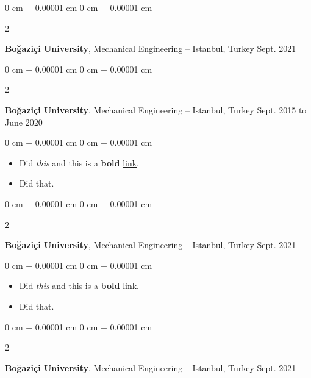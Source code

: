 \documentclass[10pt, letterpaper]{article}
\newenvironment{highlights}{
    \begin{itemize}[
        topsep=0.10 cm,
        parsep=0.10 cm,
        partopsep=0pt,
        itemsep=0pt,
        leftmargin=0 cm + 10pt
    ]
}{
    \end{itemize}
} %
\newenvironment{onecolentry}{
    \begin{adjustwidth}{
        0 cm + 0.00001 cm
    }{
        0 cm + 0.00001 cm
    }
}{
    \end{adjustwidth}
} %
\newenvironment{twocolentry}[2][]{
    \onecolentry
    \def\secondColumn{#2}
    \setcolumnwidth{\fill, 4.5 cm}
    \begin{paracol}{2}
}{
    \switchcolumn \raggedleft \secondColumn
    \end{paracol}
    \endonecolentry
} %
\begin{document}
        \vspace{0.2 cm}

        \begin{twocolentry}{
            Sept. 2021
        }
            \textbf{Boğaziçi University}, Mechanical Engineering -- Istanbul, Turkey\end{twocolentry}



        \vspace{0.2 cm}

        \begin{twocolentry}{
            Sept. 2015 to June 2020
        }
            \textbf{Boğaziçi University}, Mechanical Engineering -- Istanbul, Turkey\end{twocolentry}

        \vspace{0.10 cm}
        \begin{onecolentry}
            \begin{highlights}
                \item Did \textit{this} and this is a \textbf{bold} \href{https://example.com}{link}.
                \item Did that.
            \end{highlights}
        \end{onecolentry}


        \vspace{0.2 cm}

        \begin{twocolentry}{
            Sept. 2021
        }
            \textbf{Boğaziçi University}, Mechanical Engineering -- Istanbul, Turkey\end{twocolentry}

        \vspace{0.10 cm}
        \begin{onecolentry}
            \begin{highlights}
                \item Did \textit{this} and this is a \textbf{bold} \href{https://example.com}{link}.
                \item Did that.
            \end{highlights}
        \end{onecolentry}


        \vspace{0.2 cm}

        \begin{twocolentry}{
            Sept. 2021
        }
            \textbf{Boğaziçi University}, Mechanical Engineering -- Istanbul, Turkey\end{twocolentry}
\end{document}
